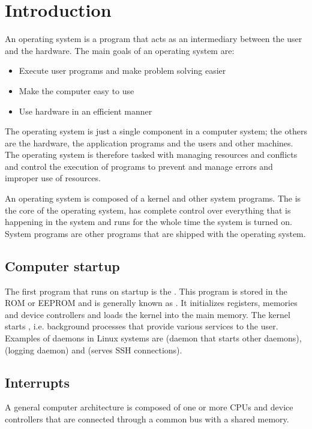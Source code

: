 \chapter{Introduction}

An operating system is a program that acts as an intermediary between the user and the hardware. The main goals of an operating system are:
\begin{itemize}
    \item Execute user programs and make problem solving easier
    \item Make the computer easy to use
    \item Use hardware in an efficient manner
\end{itemize}

The operating system is just a single component in a computer system; the others are the hardware, the application programs and the users and other machines. The operating system is therefore tasked with managing resources and conflicts and control the execution of programs to prevent and manage errors and improper use of resources.

An operating system is composed of a kernel and other system programs. The  is the core of the operating system, has complete control over everything that is happening in the system and runs for the whole time the system is turned on. System programs are other programs that are shipped with the operating system.

\section{Computer startup}

The first program that runs on startup is the . This program is stored in the ROM or EEPROM and is generally known as . It initializes registers, memories and device controllers and loads the kernel into the main memory. The kernel starts , i.e. background processes that provide various services to the user. Examples of daemons in Linux systems are  (daemon that starts other daemons),  (logging daemon) and  (serves SSH connections).

\section{Interrupts}

A general computer architecture is composed of one or more CPUs and device controllers that are connected through a common bus with a shared memory.

